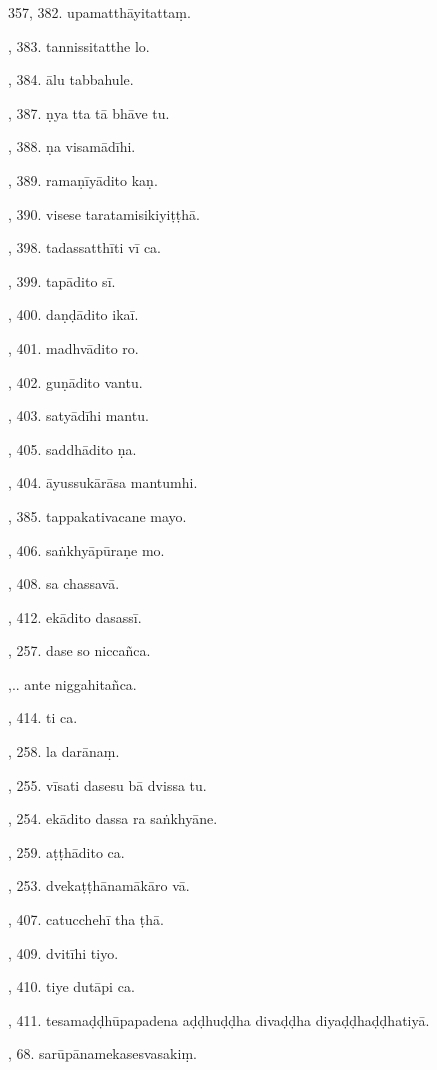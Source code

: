 357, 382. upamatthāyitattaṃ.\par {}, 383. tannissitatthe lo.\par {}, 384. ālu tabbahule.\par {}, 387. ṇya tta tā bhāve tu.\par {}, 388. ṇa visamādīhi.\par {}, 389. ramaṇīyādito kaṇ.\par {}, 390. visese taratamisikiyiṭṭhā.\par {}, 398. tadassatthīti vī ca.\par {}, 399. tapādito sī.\par {}, 400. daṇḍādito ikaī.\par {}, 401. madhvādito ro.\par {}, 402. guṇādito vantu.\par {}, 403. satyādīhi mantu.\par {}, 405. saddhādito ṇa.\par {}, 404. āyussukārāsa mantumhi.\par {}, 385. tappakativacane mayo.\par {}, 406. saṅkhyāpūraṇe mo.\par {}, 408. sa chassavā.\par {}, 412. ekādito dasassī.\par {}, 257. dase so niccañca.\par {},.. ante niggahitañca.\par {}, 414. ti ca.\par {}, 258. la darānaṃ.\par {}, 255. vīsati dasesu bā dvissa tu.\par {}, 254. ekādito dassa ra saṅkhyāne.\par {}, 259. aṭṭhādito ca.\par {}, 253. dvekaṭṭhānamākāro vā.\par {}, 407. catucchehī tha ṭhā.\par {}, 409. dvitīhi tiyo.\par {}, 410. tiye dutāpi ca.\par {}, 411. tesamaḍḍhūpapadena aḍḍhuḍḍha divaḍḍha diyaḍḍhaḍḍhatiyā.\par {}, 68. sarūpānamekasesvasakiṃ.\par \noindent
